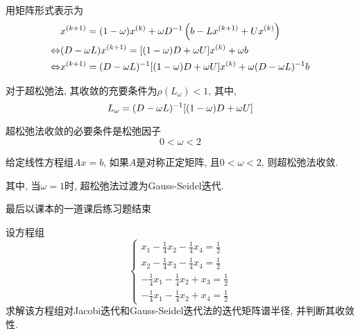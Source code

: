 用矩阵形式表示为
\begin{align*}
    &x^{(k+1)}=(1-\omega)x^{(k)}+\omega D^{-1}\left(b-Lx^{(k+1)}+Ux^{(k)}\right)\\
    \Leftrightarrow&(D-\omega L)x^{(k+1)}=[(1-\omega)D+\omega U]x^{(k)}+\omega b\\
    \Leftrightarrow&x^{(k+1)}=(D-\omega L)^{-1}[(1-\omega)D+\omega U]x^{(k)}+\omega(D-\omega L)^{-1}b
\end{align*}

对于超松弛法, 其收敛的充要条件为$\rho(L_\omega)<1$, 其中,
\begin{equation*}
    L_\omega=(D-\omega L)^{-1}[(1-\omega)D+\omega U]
\end{equation*}

\begin{theorem}
    超松弛法收敛的必要条件是松弛因子
    \begin{equation*}
        0<\omega<2
    \end{equation*}
\end{theorem}

\begin{theorem}
    给定线性方程组$Ax=b$, 如果$A$是对称正定矩阵, 且$0<\omega<2$, 则超松弛法收敛.
\end{theorem}

其中, 当$\omega=1$时, 超松弛法过渡为Gauss-Seidel迭代.

最后以课本的一道课后练习题结束

\begin{example}
    设方程组
    \begin{equation*}
        \begin{cases}
            x_1-\frac{1}{4}x_2-\frac{1}{4}x_4=\frac{1}{2}\\
            x_2-\frac{1}{4}x_3-\frac{1}{4}x_4=\frac{1}{2}\\
            -\frac{1}{4}x_1-\frac{1}{4}x_2+x_3=\frac{1}{2}\\
            -\frac{1}{4}x_1-\frac{1}{4}x_2+x_4=\frac{1}{2}
        \end{cases}
    \end{equation*}
    求解该方程组对Jacobi迭代和Gauss-Seidel迭代法的迭代矩阵谱半径, 并判断其收敛性.
\end{example}

